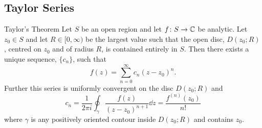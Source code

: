 \documentclass{article}
\newcommand{\discOpen}[2]{D\left({#1}; {#2}\right)}
\begin{document}
    \subsection{Taylor Series}
    \begin{theorem}{Taylor's Theorem}{}
        Let \(S\) be an open region and let \(f\colon S\to\mathbb{C}\) be analytic.
        Let \(z_0\in S\) and let \(R\in[0, \infty)\) be the largest value such that the open disc, \(\discOpen{z_0}{R}\), centred on \(z_0\) and of radius \(R\), is contained entirely in \(S\).
        Then there exists a unique sequence, \(\{c_n\}\), such that
        \[f(z) = \sum_{n=0}^{\infty} c_n(z - z_0)^n.\]
        Further this series is uniformly convergent on the disc \(\discOpen{z_0}{R}\) and 
        \[c_n = \frac{1}{2\pi i}\oint_{\gamma} \frac{f(z)}{(z - z_0)^{n+1}}\dd{z} = \frac{f^{(n)}(z_0)}{n!}\]
        where \(\gamma\) is any positively oriented contour inside \(\discOpen{z_0}{R}\) and contains \(z_0\).
    \end{theorem}
\end{document}
